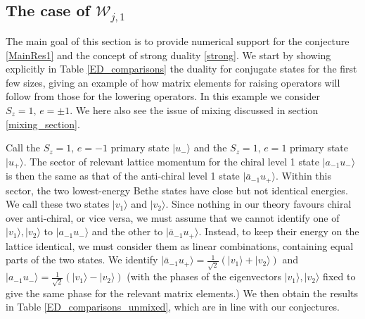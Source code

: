 \documentclass[a4paper,10pt]{article}
\newcommand{\linnea}[1]{$\framebox{\tiny L}$\ \textbf{\texttt{{\color{red}\footnotesize#1}}}}
\newcommand{\jesper}[1]{$\framebox{\tiny J}$\ \textbf{\texttt{{\color{cyan}\footnotesize#1}}}}
\newcommand{\aSt}{\mathcal{W}}
\newcommand{\AStTL}[2]{\aSt_{#1,#2}}
\begin{document}




\subsection{The case of $\AStTL{j}{1}$}\label{spin_untwisted}

The main goal of this section is to provide numerical support for the conjecture \eqref{MainRes1} and the concept of strong duality \eqref{strong}.
We start by showing explicitly in Table \ref{ED_comparisons} the duality for conjugate states for the first few sizes, giving an example of how matrix elements for raising operators will follow from those for the lowering operators. In this example we consider $S_z=1,\,e=\pm1$. We here also see the issue of mixing discussed in section \ref{mixing_section}.

Call the $S_z=1,\,e=-1$ primary state $|u_-\rangle$ and the $S_z=1,\,e=1$ primary state $|u_+\rangle$. The sector of relevant lattice momentum for the chiral level 1 state $|a_{-1}u_-\rangle$ is then the same as that of the anti-chiral level 1 state $|\bar{a}_{-1}u_+\rangle$. Within this sector, the two lowest-energy Bethe states have close but not identical energies. %
We call these two states $|v_1\rangle$ and $|v_2\rangle$. Since nothing in our theory favours chiral over anti-chiral, or vice versa, we must assume that we cannot identify one of $|v_1\rangle,|v_2\rangle$ to $|a_{-1}u_-\rangle$ and the other to $|\bar{a}_{-1}u_+\rangle$. Instead, to keep their energy on the lattice identical, we must consider them as linear combinations, containing equal parts of the two states. We identify $|\bar{a}_{-1} u_+\rangle =  \frac{1}{\sqrt{2}}(|v_1\rangle + |v_2\rangle)$ and $|a_{-1} u_-\rangle = \frac{1}{\sqrt{2}} (|v_1\rangle - |v_2\rangle)$ (with the phases of the eigenvectors $|v_1\rangle,|v_2\rangle$ fixed to give the same phase for the relevant matrix elements.) We then obtain the results in Table  \ref{ED_comparisons_unmixed}, which are in line with our conjectures.
\end{document}
